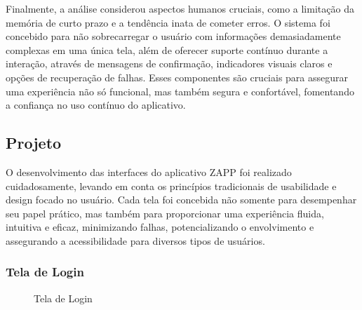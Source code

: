 \documentclass[a4paper, 12pt]{article}
\begin{document}
Finalmente, a análise considerou aspectos humanos cruciais, como a limitação da memória de curto prazo e a tendência inata de cometer erros. O sistema foi concebido para não sobrecarregar o usuário com informações demasiadamente complexas em uma única tela, além de oferecer suporte contínuo durante a interação, através de mensagens de confirmação, indicadores visuais claros e opções de recuperação de falhas. Esses componentes são cruciais para assegurar uma experiência não só funcional, mas também segura e confortável, fomentando a confiança no uso contínuo do aplicativo.

\subsection{Projeto}
O desenvolvimento das interfaces do aplicativo ZAPP foi realizado cuidadosamente, levando em conta os princípios tradicionais de usabilidade e design focado no usuário.  Cada tela foi concebida não somente para desempenhar seu papel prático, mas também para proporcionar uma experiência fluida, intuitiva e eficaz, minimizando falhas, potencializando o envolvimento e assegurando a acessibilidade para diversos tipos de usuários.

\subsubsection{Tela de Login}

\begin{figure}[H]
  \centering
  \caption{Tela de Login}
  \label{fig:login}
\end{figure}
\end{document}
